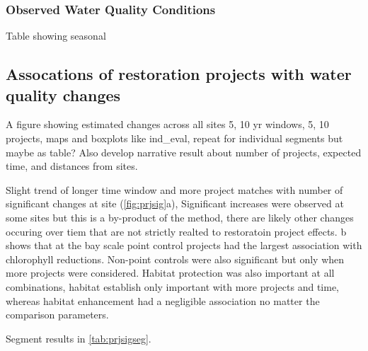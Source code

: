 \documentclass[]{article}
\begin{document}
\hypertarget{observed-water-quality-conditions}{%
\subsubsection{Observed Water Quality
Conditions}\label{observed-water-quality-conditions}}

Table showing seasonal

\hypertarget{assocations-of-restoration-projects-with-water-quality-changes}{%
\subsection{Assocations of restoration projects with water quality
changes}\label{assocations-of-restoration-projects-with-water-quality-changes}}

A figure showing estimated changes across all sites 5, 10 yr windows, 5,
10 projects, maps and boxplots like ind\_eval, repeat for individual
segments but maybe as table? Also develop narrative result about number
of projects, expected time, and distances from sites.

Slight trend of longer time window and more project matches with number
of significant changes at site (\cref{fig:prjsig}a), Significant
increases were observed at some sites but this is a by-product of the
method, there are likely other changes occuring over tiem that are not
strictly realted to restoratoin project effects. b
shows that at the bay scale point control projects had the largest
association with chlorophyll reductions. Non-point controls were also
significant but only when more projects were considered. Habitat
protection was also important at all combinations, habitat establish
only important with more projects and time, whereas habitat enhancement
had a negligible association no matter the comparison parameters.

Segment results in \cref{tab:prjsigseg}.
\end{document}
